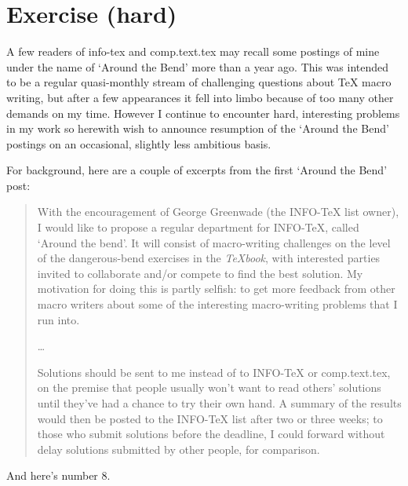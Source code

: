 \section{Exercise (hard)}

\begin{comment}
Date: 21 Jun 1993 09:49:27 -0400 (EDT)
From: Michael Downes <MJD@MATH.AMS.ORG>
Subject: Around the Bend #8
To: info-tex@shsu.edu
\end{comment}


A few readers of info-tex and comp.text.tex may recall some postings
of mine under the name of `Around the Bend' more than a year ago. This
was intended to be a regular quasi-monthly stream of challenging
questions about TeX macro writing, but after a few appearances it fell
into limbo because of too many other demands on my time.  However I
continue to encounter hard, interesting problems in my work so
herewith wish to announce resumption of the `Around the Bend' postings
on an occasional, slightly less ambitious basis.

For background, here are a couple of excerpts from the first `Around
the Bend' post:
\begin{quote}
 With the encouragement of George Greenwade (the INFO-TeX list owner), I
 would like to propose a regular department for INFO-TeX, called `Around
 the bend'. It will consist of macro-writing challenges on the level of
 the dangerous-bend exercises in the \emph{TeXbook}, with interested parties
 invited to collaborate and/or compete to find the best solution. My
 motivation for doing this is partly selfish: to get more feedback from
 other macro writers about some of the interesting macro-writing
 problems that I run into.

\ldots



 Solutions should be sent to me instead of to INFO-TeX or
 comp.text.tex, on the premise that people usually won't want to read
 others' solutions until they've had a chance to try their own hand. A
 summary of the results would then be posted to the INFO-TeX list after
 two or three weeks; to those who submit solutions before the deadline,
 I could forward without delay solutions submitted by other people, for
 comparison.
\end{quote}

And here's number 8.


